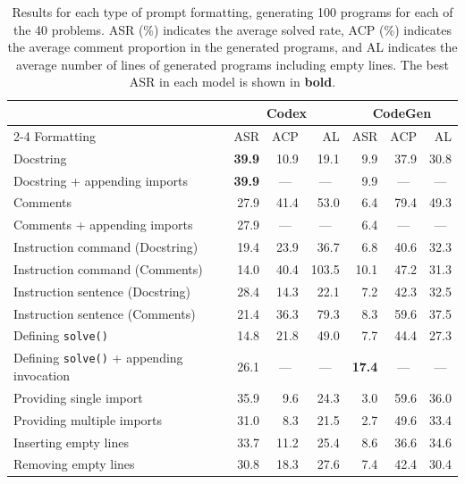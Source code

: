 \documentclass{article}
\newcommand{\bn}[1]{\textsf{\textbf{#1}}}
\newcommand{\NA}{\multicolumn{1}{c}{---}}
\begin{document}
\begin{table}[ht]
\begin{center}
\begin{minipage}{0.95\linewidth}
    \caption{Results for each type of prompt formatting, generating 100 programs for each of the 40 problems. ASR (\%) indicates the average solved rate, ACP (\%) indicates the average comment proportion in the generated programs, and AL indicates the average number of lines of generated programs including empty lines. The best ASR in each model is shown in \bn{bold}.}
    \label{table:prompts-result}
    \begin{tabular*}{\linewidth}{lrrrrrr}
        \toprule
        & \multicolumn{3}{c}{Codex} & \multicolumn{3}{c}{CodeGen} \\
        \cmidrule{2-4}\cmidrule{5-7}
        Formatting & ASR & ACP & AL & ASR & ACP & AL \\
        \midrule
        Docstring & \bn{39.9} & 10.9 & 19.1 & 9.9 & 37.9 & 30.8 \\
        Docstring + appending imports & \bn{39.9} & \NA & \NA & 9.9 & \NA & \NA \\
        Comments & 27.9 & 41.4 & 53.0 & 6.4 & 79.4 & 49.3 \\
        Comments + appending imports & 27.9 & \NA & \NA & 6.4 & \NA & \NA \\
        \midrule
        Instruction command (Docstring) & 19.4 & 23.9 & 36.7 & 6.8 & 40.6 & 32.3 \\
        Instruction command (Comments) & 14.0 & 40.4 & 103.5 & 10.1 & 47.2 & 31.3 \\
        Instruction sentence (Docstring) & 28.4 & 14.3 & 22.1 & 7.2 & 42.3 & 32.5 \\
        Instruction sentence (Comments) & 21.4 & 36.3 & 79.3 & 8.3 & 59.6 & 37.5 \\
        \midrule
        Defining \texttt{solve()} & 14.8 & 21.8 & 49.0 & 7.7 & 44.4 & 27.3 \\
        Defining \texttt{solve()} + appending invocation & 26.1 & \NA & \NA & \bn{17.4} & \NA & \NA \\
        \midrule
        Providing single import & 35.9 & 9.6 & 24.3 & 3.0 & 59.6 & 36.0 \\
        Providing multiple imports & 31.0 & 8.3 & 21.5 & 2.7 & 49.6 & 33.4 \\
        \midrule
        Inserting empty lines & 33.7 & 11.2 & 25.4 & 8.6 & 36.6 & 34.6 \\
        Removing empty lines & 30.8 & 18.3 & 27.6 & 7.4 & 42.4 & 30.4 \\
        \bottomrule
    \end{tabular*}
\end{minipage}
\end{center}
\end{table}
\end{document}
